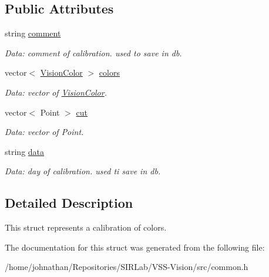 \subsection*{Public Attributes}
\begin{DoxyCompactItemize}
\item 
string \hyperlink{structcommon_1_1Calibration_af7faad7cda5adfffefa44006cdecea85}{comment}\hypertarget{structcommon_1_1Calibration_af7faad7cda5adfffefa44006cdecea85}{}\label{structcommon_1_1Calibration_af7faad7cda5adfffefa44006cdecea85}

\begin{DoxyCompactList}\small\item\em Data\+: comment of calibration. used to save in db. \end{DoxyCompactList}\item 
vector$<$ \hyperlink{structcommon_1_1VisionColor}{Vision\+Color} $>$ \hyperlink{structcommon_1_1Calibration_a219ffe804bda864b9757bc5d32ee49c4}{colors}\hypertarget{structcommon_1_1Calibration_a219ffe804bda864b9757bc5d32ee49c4}{}\label{structcommon_1_1Calibration_a219ffe804bda864b9757bc5d32ee49c4}

\begin{DoxyCompactList}\small\item\em Data\+: vector of \hyperlink{structcommon_1_1VisionColor}{Vision\+Color}. \end{DoxyCompactList}\item 
vector$<$ Point $>$ \hyperlink{structcommon_1_1Calibration_adb64222af92367a220f889876324edbc}{cut}\hypertarget{structcommon_1_1Calibration_adb64222af92367a220f889876324edbc}{}\label{structcommon_1_1Calibration_adb64222af92367a220f889876324edbc}

\begin{DoxyCompactList}\small\item\em Data\+: vector of Point. \end{DoxyCompactList}\item 
string \hyperlink{structcommon_1_1Calibration_abd3a75564db014e04bf2ee76512a3f0b}{data}\hypertarget{structcommon_1_1Calibration_abd3a75564db014e04bf2ee76512a3f0b}{}\label{structcommon_1_1Calibration_abd3a75564db014e04bf2ee76512a3f0b}

\begin{DoxyCompactList}\small\item\em Data\+: day of calibration. used ti save in db. \end{DoxyCompactList}\end{DoxyCompactItemize}


\subsection{Detailed Description}
This struct represents a calibration of colors. 

The documentation for this struct was generated from the following file\+:\begin{DoxyCompactItemize}
\item 
/home/johnathan/\+Repositories/\+S\+I\+R\+Lab/\+V\+S\+S-\/\+Vision/src/common.\+h\end{DoxyCompactItemize}
